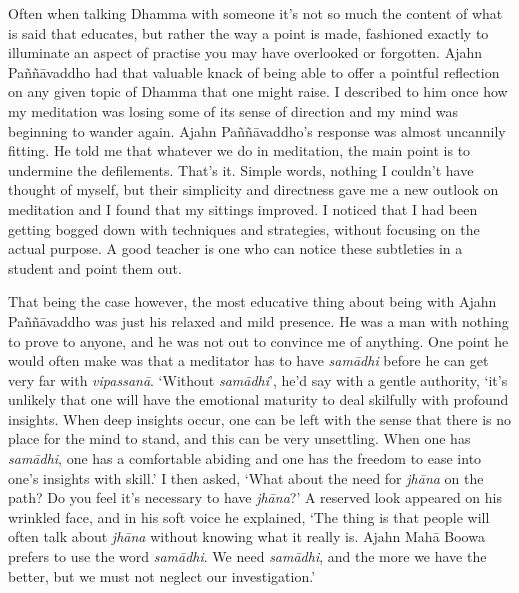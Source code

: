 Often when talking Dhamma with someone it's not so much the content of
what is said that educates, but rather the way a point is made, 
fashioned exactly to illuminate an aspect of practise you may have
overlooked or forgotten. Ajahn Paññāvaddho had that valuable knack of
being able to offer a pointful reflection on any given topic of Dhamma
that one might raise. I described to him once how my meditation was
losing some of its sense of direction and my mind was beginning to
wander again. Ajahn Paññāvaddho's response was almost uncannily fitting. 
He told me that whatever we do in meditation, the main point is to
undermine the defilements. That's it. Simple words, nothing I couldn't
have thought of myself, but their simplicity and directness gave me a
new outlook on meditation and I found that my sittings improved. I
noticed that I had been getting bogged down with techniques and
strategies, without focusing on the actual purpose. A good teacher is
one who can notice these subtleties in a student and point them out. 

That being the case however, the most educative thing about being with
Ajahn Paññāvaddho was just his relaxed and mild presence. He was a man
with nothing to prove to anyone, and he was not out to convince me of
anything. One point he would often make was that a meditator has to have
\emph{samādhi} before he can get very far with \emph{vipassanā}. 
`Without \emph{samādhi}', he'd say with a gentle authority, `it's
unlikely that one will have the emotional maturity to deal skilfully
with profound insights. When deep insights occur, one can be left with
the sense that there is no place for the mind to stand, and this can be
very unsettling. When one has \emph{samādhi}, one has a comfortable
abiding and one has the freedom to ease into one's insights with skill.'
I then asked, `What about the need for \emph{jhāna} on the path? Do you
feel it's necessary to have \emph{jhāna}?' A reserved look appeared on
his wrinkled face, and in his soft voice he explained, `The thing is
that people will often talk about \emph{jhāna} without knowing what it
really is. Ajahn Mahā Boowa prefers to use the word \emph{samādhi}. We
need \emph{samādhi}, and the more we have the better, but we must not
neglect our investigation.'

